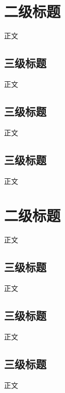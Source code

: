 \section{二级标题}
正文

\subsection{三级标题}
正文

\subsection{三级标题}
正文

\subsection{三级标题}
正文

\section{二级标题}
正文

\subsection{三级标题}
正文

\subsection{三级标题}
正文

\subsection{三级标题}
正文
